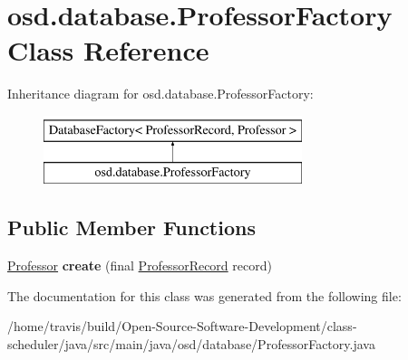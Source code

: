 \hypertarget{classosd_1_1database_1_1_professor_factory}{\section{osd.\-database.\-Professor\-Factory Class Reference}
\label{classosd_1_1database_1_1_professor_factory}
}
Inheritance diagram for osd.\-database.\-Professor\-Factory\-:\begin{figure}[H]
\begin{center}
\leavevmode
\includegraphics[height=2.000000cm]{classosd_1_1database_1_1_professor_factory}
\end{center}
\end{figure}
\subsection*{Public Member Functions}
\begin{DoxyCompactItemize}
\item 
\hypertarget{classosd_1_1database_1_1_professor_factory_abc33e8884766fdda3c30737082d37db2}{\hyperlink{interfaceosd_1_1input_1_1_professor}{Professor} {\bfseries create} (final \hyperlink{classosd_1_1database_1_1_professor_record}{Professor\-Record} record)}\label{classosd_1_1database_1_1_professor_factory_abc33e8884766fdda3c30737082d37db2}

\end{DoxyCompactItemize}


The documentation for this class was generated from the following file\-:\begin{DoxyCompactItemize}
\item 
/home/travis/build/\-Open-\/\-Source-\/\-Software-\/\-Development/class-\/scheduler/java/src/main/java/osd/database/Professor\-Factory.\-java\end{DoxyCompactItemize}

